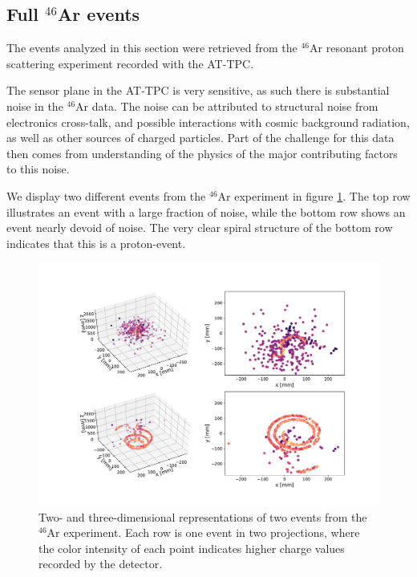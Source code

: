 \subsection{Full \texorpdfstring{${}^{46}$Ar}{46Ar}  events}\label{sec:data_real}

The events analyzed in this section were retrieved from the ${}^{46}$Ar resonant proton scattering experiment recorded with the AT-TPC. 

The sensor plane in the AT-TPC is very sensitive, as such there is substantial noise in the ${}^{46}$Ar data. The noise can be attributed to structural noise from electronics cross-talk, and possible interactions with cosmic background radiation, as well as other sources of charged particles. Part of the challenge for this data then comes from understanding of the physics of the major contributing factors to this noise. 

We display two different events from the ${}^{46}$Ar experiment in figure \ref{fig:samples}. The top row illustrates an event with a large fraction of noise, while the bottom row shows an event nearly devoid of noise. The very clear spiral structure of the bottom row indicates that this is a proton-event.

\begin{figure}[ht]
\centering
\includegraphics[width=\textwidth]{../plots/display_eventsfull_.pdf}
\caption[Displaying un-filtered events in 2D and 3D]{Two- and three-dimensional representations of two events from the ${}^{46}$Ar experiment. Each row is one event in two projections, where the color intensity of each point indicates higher charge values recorded by the detector.}\label{fig:samples}
\end{figure}

